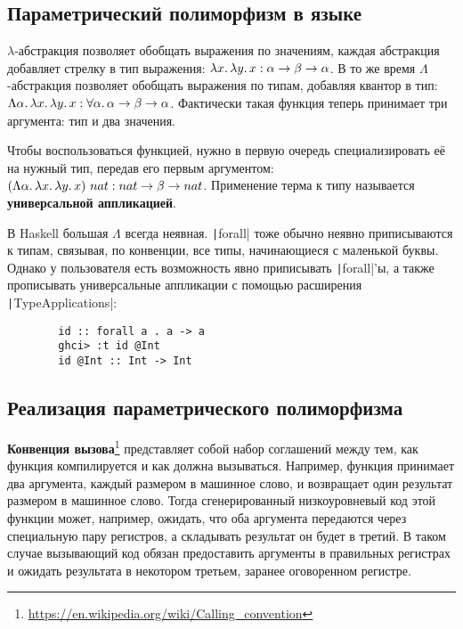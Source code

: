 \documentclass[12pt]{article}
\newcommand{\vocab}[1]{\textbf{#1}} %
\newcommand{\ap}{~}
\begin{document}
    \subsection{Параметрический полиморфизм в языке}

    $\lambda$-абстракция позволяет обобщать выражения по значениям, каждая абстракция добавляет стрелку в тип выражения: $\lambda x\ldotp \lambda y\ldotp x : \alpha\to\beta\to\alpha$.
    В то же время $\Lambda$-абстракция позволяет обобщать выражения по типам, добавляя квантор в тип: $\Lambda \alpha\ldotp\lambda x\ldotp \lambda y\ldotp x : \forall \alpha\ldotp \alpha\to\beta\to\alpha$.
    Фактически такая функция теперь принимает три аргумента: тип и два значения.

    Чтобы воспользоваться функцией, нужно в первую очередь специализировать её на нужный тип, передав его первым аргументом: $(\Lambda \alpha\ldotp\lambda x\ldotp \lambda y\ldotp x)\ap nat : nat\to\beta\to nat$.
    Применение терма к типу называется \vocab{универсальной аппликацией}.

    В Haskell большая $\Lambda$ всегда неявная.
    \texttt|forall| тоже обычно неявно приписываются к типам, связывая, по конвенции, все типы, начинающиеся с маленькой буквы.
    Однако у пользователя есть возможность явно приписывать \texttt|forall|'ы, а также прописывать универсальные аппликации с помощью расширения \texttt|TypeApplications|:
    \begin{verbatim}
        id :: forall a . a -> a
        ghci> :t id @Int
        id @Int :: Int -> Int
    \end{verbatim}


    \subsection{Реализация параметрического полиморфизма}




    \vocab{Конвенция вызова}\footnote{\url{https://en.wikipedia.org/wiki/Calling_convention}} представляет собой набор соглашений между тем, как функция компилируется и как должна вызываться.
    Например, функция принимает два аргумента, каждый размером в машинное слово, и возвращает один результат размером в машинное слово.
    Тогда сгенерированный низкоуровневый код этой функции может, например, ожидать, что оба аргумента передаются через специальную пару регистров, а складывать результат он будет в третий.
    В таком случае вызывающий код обязан предоставить аргументы в правильных регистрах и ожидать результата в некотором третьем, заранее оговоренном регистре.
\end{document}

